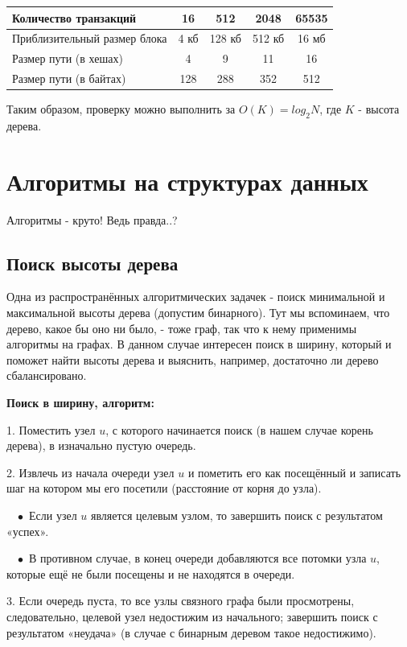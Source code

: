 \documentclass[utf8,14pt,a4paper,oneside,russian]{book}
\begin{document}
	\begin{longtable}{l|c|c|c|c}
		Количество транзакций&16&512&2048&65535\\\hline
		Приблизительный размер блока&4 кб&128 кб& 512 кб&16 мб\\\hline
		Размер пути (в хешах)&4&9&11&16\\\hline
		Размер пути (в байтах)&128&288&352&512\\
	\end{longtable}

	Таким образом, проверку можно выполнить за $O(K)=log_2N$, где $K$ - высота дерева.
	
	\newpage
	\section{Алгоритмы на структурах данных}
	
	Алгоритмы - круто! Ведь правда..?
	
	\subsection{Поиск высоты дерева}
	
	Одна из распространённых алгоритмических задачек - поиск минимальной и максимальной высоты дерева (допустим бинарного). Тут мы вспоминаем, что дерево, какое бы оно ни было, - тоже граф, так что к нему применимы алгоритмы на графах. В данном случае интересен поиск в ширину, который и поможет найти высоты дерева и выяснить, например, достаточно ли дерево сбалансировано.
	
	\textbf{Поиск в ширину, алгоритм:}
	
	1. Поместить узел $u$, с которого начинается поиск (в нашем случае корень дерева), в изначально пустую очередь.
	
	2. Извлечь из начала очереди узел $u$ и пометить его как посещённый и записать шаг на котором мы его посетили (расстояние от корня до узла).
	
	$\; \; \; \bullet$ Если узел $u$ является целевым узлом, то завершить поиск с результатом «успех».
	
	$\; \; \; \bullet$ В противном случае, в конец очереди добавляются все потомки узла $u$, которые ещё не были посещены и не находятся в очереди.
	
	3. Если очередь пуста, то все узлы связного графа были просмотрены, следовательно, целевой узел недостижим из начального; завершить поиск с результатом «неудача» (в случае с бинарным деревом такое недостижимо).
	
\end{document}
